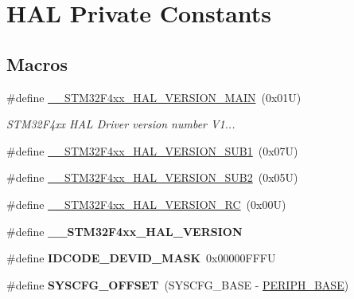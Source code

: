 \hypertarget{group___h_a_l___private___constants}{}\section{H\+AL Private Constants}
\label{group___h_a_l___private___constants}
\subsection*{Macros}
\begin{DoxyCompactItemize}
\item 
\#define \hyperlink{group___h_a_l___private___constants_gadaedd4f6c52f98c7a4ba371ec551b6ce}{\+\_\+\+\_\+\+S\+T\+M32\+F4xx\+\_\+\+H\+A\+L\+\_\+\+V\+E\+R\+S\+I\+O\+N\+\_\+\+M\+A\+IN}~(0x01\+U)
\begin{DoxyCompactList}\small\item\em S\+T\+M32\+F4xx H\+AL Driver version number V1... \end{DoxyCompactList}\item 
\#define \hyperlink{group___h_a_l___private___constants_ga9d5e3917a3f5a417be6c8423faf78f0e}{\+\_\+\+\_\+\+S\+T\+M32\+F4xx\+\_\+\+H\+A\+L\+\_\+\+V\+E\+R\+S\+I\+O\+N\+\_\+\+S\+U\+B1}~(0x07\+U)
\item 
\#define \hyperlink{group___h_a_l___private___constants_ga87b379595edcc7d72d78b2263ae08dee}{\+\_\+\+\_\+\+S\+T\+M32\+F4xx\+\_\+\+H\+A\+L\+\_\+\+V\+E\+R\+S\+I\+O\+N\+\_\+\+S\+U\+B2}~(0x05\+U)
\item 
\#define \hyperlink{group___h_a_l___private___constants_ga61fad66d665ed89f1227e459e480e28b}{\+\_\+\+\_\+\+S\+T\+M32\+F4xx\+\_\+\+H\+A\+L\+\_\+\+V\+E\+R\+S\+I\+O\+N\+\_\+\+RC}~(0x00\+U)
\item 
\#define {\bfseries \+\_\+\+\_\+\+S\+T\+M32\+F4xx\+\_\+\+H\+A\+L\+\_\+\+V\+E\+R\+S\+I\+ON}
\item 
\mbox{\label{group___h_a_l___private___constants_gaeeece10cca80f3c632d3d77c3f2917b6}} 
\#define {\bfseries I\+D\+C\+O\+D\+E\+\_\+\+D\+E\+V\+I\+D\+\_\+\+M\+A\+SK}~0x00000\+F\+F\+FU
\item 
\mbox{\label{group___h_a_l___private___constants_ga13f7abe3641989d4d063ad21962da8b0}} 
\#define {\bfseries S\+Y\+S\+C\+F\+G\+\_\+\+O\+F\+F\+S\+ET}~(S\+Y\+S\+C\+F\+G\+\_\+\+B\+A\+SE -\/ \hyperlink{group___peripheral__memory__map_ga9171f49478fa86d932f89e78e73b88b0}{P\+E\+R\+I\+P\+H\+\_\+\+B\+A\+SE})

\end{DoxyCompactItemize}
